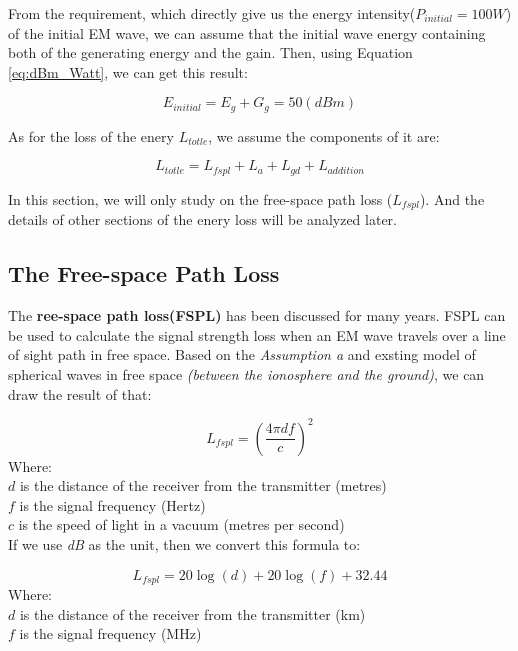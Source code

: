 \documentclass{mcmthesis}
\begin{document}
    From the requirement, which directly give us the energy intensity($P_{initial} = 100 W $) of the initial EM wave, we can assume that the initial wave energy containing both of the generating energy and the gain. Then, using Equation \ref{eq:dBm_Watt}, we can get this result:

      \begin{equation}\label{eq:E_initial}
        E_{initial} = E_{g} + G_{g} = 50 (dBm)
      \end{equation}

    As for the loss of the enery $L_{totle}$, we assume the components of it are:

      \begin{equation}
        L_{totle} = L_{fspl} + L_{a} + L_{gd} + L_{addition}
      \end{equation}

     In this section, we will only study on the free-space path loss ($L_{fspl}$). And the details of other sections of the enery loss will be analyzed later.

  \subsection{The Free-space Path Loss}

      The \textbf{ree-space path loss(FSPL)}\cite{freespacepathloss} has been discussed for many years. FSPL can be used to calculate the signal strength loss when an EM wave travels over a line of sight path in free space. Based on the \emph{Assumption a} and exsting model of spherical waves in free space \emph{(between the ionosphere and the ground)}, we can draw the result of that:

        \begin{equation}\label{eq:FSPL_old}
          L_{fspl} = (\frac{4 \pi d f}{c})^{2}
        \end{equation}
        Where: \\
        $d$ is the distance of the receiver from the transmitter (metres)\\
        $f$ is the signal frequency (Hertz)\\
        $c$ is the speed of light in a vacuum (metres per second)\\

      If we use \emph{dB} as the unit, then we convert this formula to:

        \begin{equation}\label{eq:FSPL_applied}
          L_{fspl} = 20\log(d) + 20\log(f) + 32.44
        \end{equation}
        Where:\\
        $d$ is the distance of the receiver from the transmitter (km)\\
        $f$ is the signal frequency (MHz)\\
\end{document}

